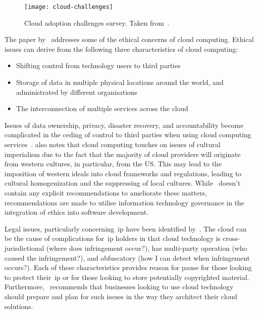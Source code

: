 \begin{figure}[!htb]
    \centering
    \texttt{[image: cloud-challenges]}
    \caption{Cloud adoption challenges survey. Taken from~\citep{cloud-survey}.}\label{fig:cloud-challenges}
\end{figure}

The paper by~\citet{timmermans2010ethics} addresses some of the ethical concerns of cloud computing.
Ethical issues can derive from the following three characteristics of cloud computing:

\begin{itemize}
    \item Shifting control from technology users to third parties
    \item Storage of data in multiple physical locations around the world, and administrated by different organisations
    \item The interconnection of multiple services across the cloud
\end{itemize}

Issues of data ownership, privacy, disaster recovery,
and accountability become complicated in the ceding of control to third parties when using cloud computing services~\citep{timmermans2010ethics}.
\citet{ess_2008} also notes that cloud computing touches on issues of cultural imperialism due to the fact
that the majority of cloud providers will originate from western cultures, in particular, from the US\@.
This may lead to the imposition of western ideals into cloud frameworks and regulations,
leading to cultural homogenization and the suppressing of local cultures.
While~\citet{timmermans2010ethics} doesn't contain any explicit recommendations to ameliorate these matters,
recommendations are made to utilise information technology governance in the integration of ethics into software development.

Legal issues, particularly concerning~\gls{ip} have been identified by~\citet{roszell_baker_2020}.
The cloud can be the cause of complications for~\gls{ip} holders in that cloud technology is cross-jurisdictional
(where does infringement occur?),
has multi-party operation (who caused the infringement?), and obfuscatory (how I can detect when infringement occurs?).
Each of these characteristics provides reason for pause for those
looking to protect their~\gls{ip} or for those looking to store potentially copyrighted material.
Furthermore,~\citet{roszell_baker_2020} recommends
that businesses looking to use cloud technology should prepare and plan for such issues in the way
they architect their cloud solutions.

